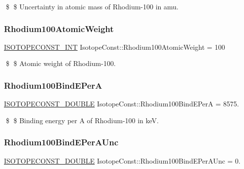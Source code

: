 \$ \$ Uncertainty in atomic mass of Rhodium-\/100 in amu. \mbox{\label{group___isotope_const-_rhodium-_rh100_ga36c97e33d57041eb40756de80b7f1cb8}} 
\subsubsection{\texorpdfstring{Rhodium100\+Atomic\+Weight}{Rhodium100AtomicWeight}}
{\footnotesize\ttfamily \mbox{\hyperlink{group___isotope_const-_macros_ga5f18360b3e99483a35c32d789e62621c}{I\+S\+O\+T\+O\+P\+E\+C\+O\+N\+S\+T\+\_\+\+I\+NT}} Isotope\+Const\+::\+Rhodium100\+Atomic\+Weight = 100}

\$ \$ Atomic weight of Rhodium-\/100. \mbox{\label{group___isotope_const-_rhodium-_rh100_ga89c6229d879f3738706ac1475521a93a}} 
\subsubsection{\texorpdfstring{Rhodium100\+Bind\+E\+PerA}{Rhodium100BindEPerA}}
{\footnotesize\ttfamily \mbox{\hyperlink{group___isotope_const-_macros_ga8f45a7272ce02c0b4c65c44636ed719a}{I\+S\+O\+T\+O\+P\+E\+C\+O\+N\+S\+T\+\_\+\+D\+O\+U\+B\+LE}} Isotope\+Const\+::\+Rhodium100\+Bind\+E\+PerA = 8575.}

\$ \$ Binding energy per A of Rhodium-\/100 in keV. \mbox{\label{group___isotope_const-_rhodium-_rh100_ga7c21b252943d0ef3365b4e4e6e6359fa}} 
\subsubsection{\texorpdfstring{Rhodium100\+Bind\+E\+Per\+A\+Unc}{Rhodium100BindEPerAUnc}}
{\footnotesize\ttfamily \mbox{\hyperlink{group___isotope_const-_macros_ga8f45a7272ce02c0b4c65c44636ed719a}{I\+S\+O\+T\+O\+P\+E\+C\+O\+N\+S\+T\+\_\+\+D\+O\+U\+B\+LE}} Isotope\+Const\+::\+Rhodium100\+Bind\+E\+Per\+A\+Unc = 0.}

